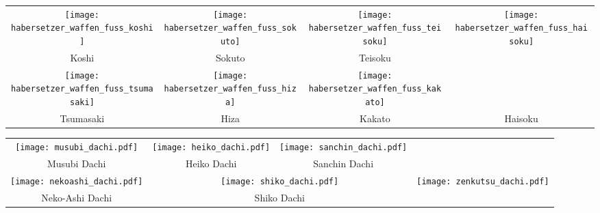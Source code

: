 \clearpage
\pagebreak
\setcounter{num}{0}
\setcounter{numz}{0}
\begin{tcolorbox}[width=\textwidth,height=\textheight,right=12pt,left=12pt,colframe=GKD,colback=white,fonttitle=\bfseries,coltitle=white,title=Allgemeines:\indent Körperwaffen]
	\null\vfill\null	
	\begin{tabularx}{\textwidth}{cccc}
		\texttt{[image: habersetzer\_waffen\_fuss\_koshi]} 		& \texttt{[image: habersetzer\_waffen\_fuss\_sokuto]} 		& \texttt{[image: habersetzer\_waffen\_fuss\_teisoku]} &
		\multirow{3}{*}{\texttt{[image: habersetzer\_waffen\_fuss\_haisoku]}}
		\\
		Koshi 		& Sokuto 	& Teisoku &\\
		\texttt{[image: habersetzer\_waffen\_fuss\_tsumasaki]} 	& \texttt{[image: habersetzer\_waffen\_fuss\_hiza]} 		&  \texttt{[image: habersetzer\_waffen\_fuss\_kakato]} &\\
		Tsumasaki 	& Hiza 		& Kakato & Haisoku\\
	\end{tabularx}
	\null\vfill\null
\end{tcolorbox}
\clearpage
\pagebreak
\begin{tcolorbox}[width=\textwidth,height=\textheight,right=12pt,left=12pt,colframe=GKD,colback=white,fonttitle=\bfseries,coltitle=white,title=Allgemeines:\indent Grundlegende Dachi Waza]
	\null\vfill\null
	\setcounter{num}{0}
	\setcounter{numz}{0}	
	\begin{tabularx}{\textwidth}{cccc}
		\texttt{[image: musubi\_dachi.pdf]}	&
		\texttt{[image: heiko\_dachi.pdf]} &
		\texttt{[image: sanchin\_dachi.pdf]} & \\
		Musubi Dachi 		& Heiko Dachi 	& Sanchin Dachi & \\
		\texttt{[image: nekoashi\_dachi.pdf]} & \multicolumn{2}{c}{\texttt{[image: shiko\_dachi.pdf]}} & \multirow[t]{3}{*}{\texttt{[image: zenkutsu\_dachi.pdf]}}\\
		Neko-Ashi Dachi 	& \multicolumn{2}{c}{Shiko Dachi} 	& Zenkutsu Dachi  \\							
	\end{tabularx}\\\null\vfill\null
\end{tcolorbox}
\clearpage
\pagebreak
